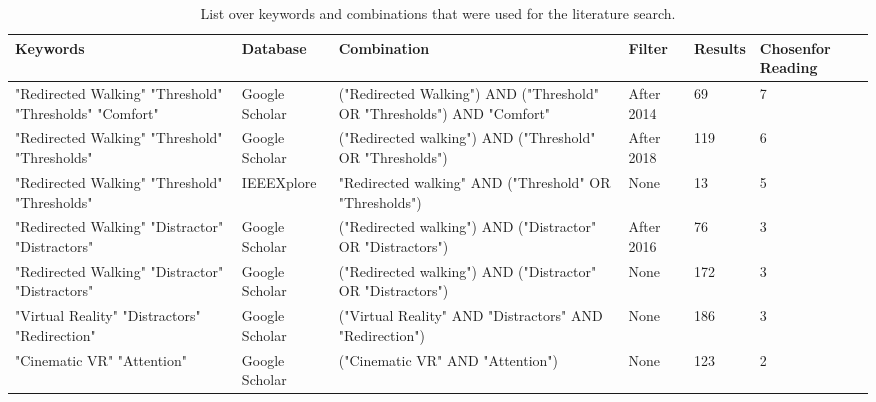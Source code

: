 \begin{table}[tbh!]
\centering
\begin{tabularx}{\textwidth}{|m{2cm}|m{1.7cm}|m{2.7cm}|m{1.5cm}|m{1.20cm}|m{3.375cm}|} 
\hline
Keywords & Database & Combination & Filter & Results & Chosen\newline for Reading\\ 
\hline
"Redirected Walking"\newline
"Threshold"\newline
"Thresholds"\newline
"Comfort"& Google Scholar & ("Redirected Walking") AND ("Threshold" OR "Thresholds") AND "Comfort" & After 2014 & 69 & 7\\ 
\hline
"Redirected Walking"\newline
"Threshold"\newline
"Thresholds" & Google Scholar & ("Redirected walking") AND ("Threshold" OR "Thresholds") & After 2018 & 119 & 6\\
\hline
"Redirected Walking"\newline
"Threshold"\newline
"Thresholds" & IEEEXplore & "Redirected walking" AND ("Threshold" OR "Thresholds") & None & 13 & 5\\ 
\hline
"Redirected Walking"\newline
"Distractor"\newline
"Distractors" & Google Scholar & ("Redirected walking") AND ("Distractor" OR "Distractors") & After 2016 & 76 & 3\\
\hline
"Redirected Walking"\newline
"Distractor"\newline
"Distractors" & Google Scholar & ("Redirected walking") AND ("Distractor" OR "Distractors") & None & 172 & 3\\
\hline
"Virtual Reality"\newline
"Distractors"\newline
"Redirection" & Google Scholar & ("Virtual Reality" AND "Distractors" AND "Redirection") & None & 186 & 3\\
\hline
"Cinematic VR"\newline
"Attention" & Google Scholar & ("Cinematic VR" AND "Attention") & None & 123 & 2\\
\hline
\end{tabularx}
\caption[Keywords and Combinations That Were Used for the Literature Search]{List over keywords and combinations that were used for the literature search.}
\label{table:literaturekeywords}
\end{table}

